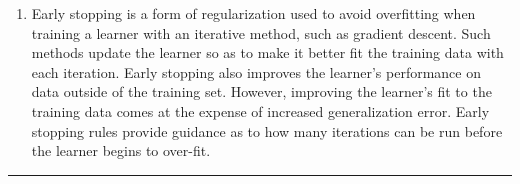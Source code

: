 \documentclass[11pt]{article}
\providecommand{\tightlist}{%
      \setlength{\itemsep}{0pt}\setlength{\parskip}{0pt}}
\begin{document}
    \begin{enumerate}
\def\labelenumi{\arabic{enumi}.}
\setcounter{enumi}{4}
\tightlist
\item
  Early stopping is a form of regularization used to avoid overfitting
  when training a learner with an iterative method, such as gradient
  descent. Such methods update the learner so as to make it better fit
  the training data with each iteration. Early stopping also improves
  the learner's performance on data outside of the training set.
  However, improving the learner's fit to the training data comes at the
  expense of increased generalization error. Early stopping rules
  provide guidance as to how many iterations can be run before the
  learner begins to over-fit.
\end{enumerate}

    \begin{center}\rule{0.5\linewidth}{\linethickness}\end{center}


    
    
    
    
\end{document}
